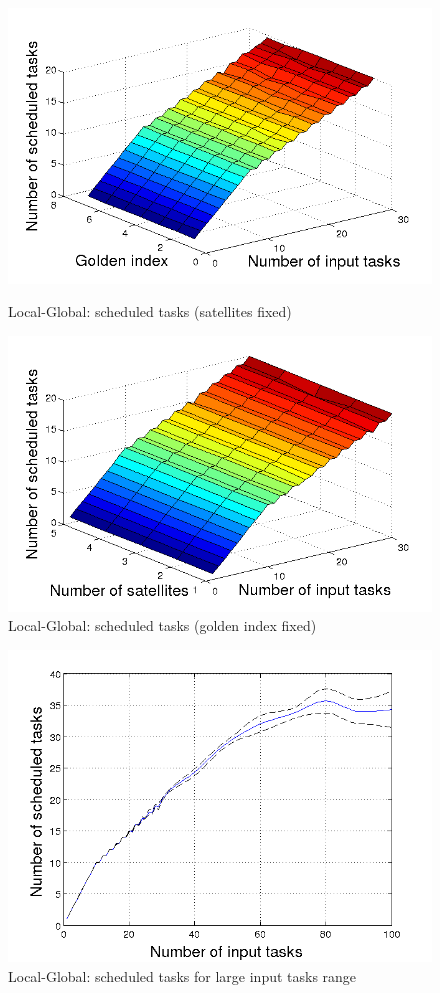\begin{figure}[h!]
  \begin{minipage}[b]{0.5\linewidth}
    \includegraphics[width=\linewidth]{Figures/aLG_satsfix.png}
    \caption{Local-Global: scheduled tasks (satellites fixed)}\label{fig_aLG_satsfix}
  \end{minipage}   
  \begin{minipage}[b]{0.5\linewidth}
    \includegraphics[width=\linewidth]{Figures/aLG_goldenfix.png}
    \caption{Local-Global: scheduled tasks (golden index fixed)}\label{fig_aLG_goldenfix}
  \end{minipage}
\end{figure}
\begin{figure}[h!]
  \begin{minipage}[b]{\linewidth}
  \centering
    \includegraphics[width=0.6\linewidth]{Figures/aLG_alim.png}
    \caption{Local-Global: scheduled tasks for large input tasks range}\label{fig_aLG_alim}
  \centering
  \end{minipage}
  \hfill
\end{figure}

